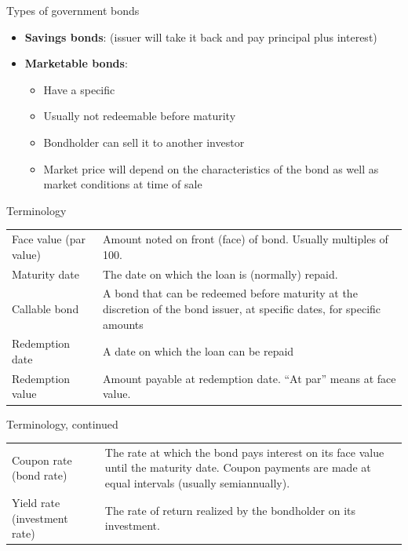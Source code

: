 \documentclass{beamer}
\begin{document}
\begin{frame}{Types of government bonds}

\begin{itemize}
\item \textbf{Savings bonds}:  (issuer will take it back and pay principal plus interest)
\item \textbf{Marketable bonds}:
  \begin{itemize}
  \item Have a specific 
  \item Usually not redeemable before maturity
  \item Bondholder can sell it to another investor
  \item Market price will depend on the characteristics of the bond as well as market conditions at time of sale
  \end{itemize}
\end{itemize}

\end{frame}

\begin{frame}{Terminology}

\renewcommand{\arraystretch}{1.3}
\small
\begin{tabular}{>{\raggedright\arraybackslash}p{}>{\raggedright\arraybackslash}p{}}
\toprule
Face value (par value) & Amount noted on front (face) of bond. Usually multiples of 100. \\
Maturity date & The date on which the loan is (normally) repaid. \\
Callable bond & A bond that can be redeemed before maturity at the discretion of the bond issuer, at specific dates, for specific amounts \\
Redemption date & A date on which the loan can be repaid \\
Redemption value & Amount payable at redemption date. ``At par'' means at face value. \\
\bottomrule
\end{tabular}

\end{frame}

\begin{frame}{Terminology, continued}

\renewcommand{\arraystretch}{1.3}
\small
\begin{tabular}{>{\raggedright\arraybackslash}p{}>{\raggedright\arraybackslash}p{}}
\toprule
Coupon rate (bond rate) & The rate at which the bond pays interest on its face value until the maturity date. Coupon payments are made at equal intervals (usually semiannually). \\
Yield rate (investment rate) & The rate of return realized by the bondholder on its investment. \\
\bottomrule
\end{tabular}

\end{frame}
\end{document}

